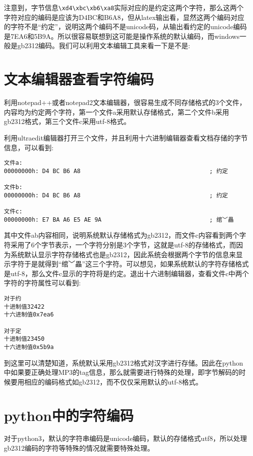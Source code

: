 \documentclass[twoside,11pt]{book}
\begin{document}
注意到，字节信息\lstinline!\xd4\xbc\xb6\xa8!实际对应的是约定这两个字符，那么这两个字符对应的编码是应该为D4BC和B6A8，但从latex输出看，显然这两个编码对应的字符不是“约定”，说明这两个编码不是unicode码，从输出看约定的unicode编码是7EA6和5B9A。所以很容易联想到这可能是操作系统的默认编码，而windows一般是gb2312编码。我们可以利用文本编辑工具来看一下是不是:

\section{文本编辑器查看字符编码}
利用notepad++或者notepad2文本编辑器，很容易生成不同存储格式的3个文件，内容均为约定两个字符，第一个文件a采用默认存储格式，第二个文件b采用gb2312格式，第三个文件c采用utf-8格式。

利用ultraedit编辑器打开三个文件，并且利用十六进制编辑器查看文档存储的字节信息，可以看到:
\begin{lstlisting}
文件a:
00000000h: D4 BC B6 A8                                     ; 约定

文件b:
00000000h: D4 BC B6 A8                                     ; 约定

文件c:
00000000h: E7 BA A6 E5 AE 9A                               ; 绾﹀畾
\end{lstlisting}

其中文件ab内容相同，说明系统默认存储格式为gb2312，而文件c内容看到两个字符采用了6个字节表示，一个字符分别是3个字节，这就是utf-8的存储格式，而因为系统默认显示字符存储格式也是gb2312，因此系统会根据两个字节的信息来显示字符于是就得到“绾﹀畾”这三个字符。可以想见，如果系统默认的字符存储格式是utf-8，那么文件c显示的字符将是约定。退出十六进制编辑器，查看文件c中两个字符的字符属性可以看到:
\begin{lstlisting}
对于约
十进制值32422
十六进制值0x7ea6

对于定
十进制值23450
十六进制值0x5b9a
\end{lstlisting}

到这里可以清楚知道，系统默认采用gb2312格式对汉字进行存储。因此在python中如果要正确处理MP3的tag信息，那么就需要进行特殊的处理，即字节解码的时候要用相应的编码格式如gb2312，而不仅仅采用默认的utf-8格式。

\section{python中的字符编码}

对于python3，默认的字符串编码是unicode编码，默认的存储格式utf8，所以处理gb2312编码的字符等特殊的情况就需要特殊处理。
\end{document}
